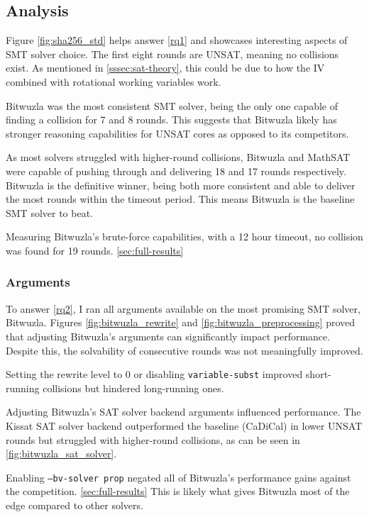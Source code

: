 \documentclass[a4paper]{report}
\begin{document}
\pagebreak
\subsection{Analysis}
\label{sssec:analysis}

Figure \ref{fig:sha256_std} helps answer \ref{rq1} and showcases interesting aspects of SMT solver choice.
The first eight rounds are UNSAT, meaning no collisions exist.
As mentioned in \ref{sssec:sat-theory}, this could be due to how the IV combined with rotational working variables work.

Bitwuzla was the most consistent SMT solver, being the only one capable of finding a collision for 7 and 8 rounds.
This suggests that Bitwuzla likely has stronger reasoning capabilities for UNSAT cores as opposed to its competitors.

As most solvers struggled with higher-round collisions, Bitwuzla and MathSAT were capable of pushing through and delivering 18 and 17 rounds respectively.
Bitwuzla is the definitive winner, being both more consistent and able to deliver the most rounds within the timeout period.
This means Bitwuzla is the baseline SMT solver to beat.

Measuring Bitwuzla's brute-force capabilities, with a 12 hour timeout, no collision was found for 19 rounds. \ref{sec:full-results}

\subsubsection{Arguments}
\label{sssec:sat-solver-args}

To answer \ref{rq2}, I ran all arguments available on the most promising SMT solver, Bitwuzla.
Figures \ref{fig:bitwuzla_rewrite} and \ref{fig:bitwuzla_preprocessing} proved that adjusting Bitwuzla's arguments can significantly impact performance.
Despite this, the solvability of consecutive rounds was not meaningfully improved.

Setting the rewrite level to 0 or disabling \texttt{variable-subst} improved short-running collisions but hindered long-running ones.

Adjusting Bitwuzla's SAT solver backend arguments influenced performance.
The Kissat SAT solver backend outperformed the baseline (CaDiCal) in lower UNSAT rounds but struggled with higher-round collisions, as can be seen in \ref{fig:bitwuzla_sat_solver}.

Enabling \texttt{--bv-solver prop} negated all of Bitwuzla's performance gains against the competition. \ref{sec:full-results}
This is likely what gives Bitwuzla most of the edge compared to other solvers.
\end{document}
